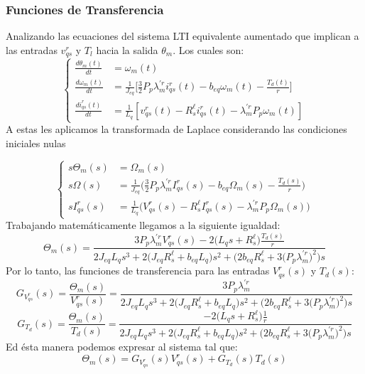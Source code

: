 \documentclass[blue,fullpaper]{ludusofficial}  %
\begin{document}
\subsubsection{Funciones de Transferencia}
Analizando las ecuaciones del sistema LTI equivalente aumentado que implican a las entradas $v^r_{qs}$ y $T_l$ hacia la salida $\theta_m$. Los cuales son:
\begin{equation}
\label{eq:modelo-lti-transferencias}
\left\{
\begin{aligned}
\frac{d\theta_m(t)}{dt} &= \omega_m(t) \\[1.5ex]
\frac{d\omega_{m}(t)}{dt} &= \frac{1}{J_{eq}} \Bigg[ \frac{3}{2}P_{p} \lambda_{m}^{'r} i_{qs}^{r}(t) - b_{eq} \omega_{m}(t) - \frac{T_d(t)}{r} \Bigg]  \\[1.5ex]
\frac{di_{qs}^{r}(t)}{dt}  &= \frac{1}{L_{q} } \left[ v_{qs}^{r}(t) - R_{s}^{\ell} i_{qs}^{r}(t) - \lambda_{m}^{'r}P_{p} \omega_{m}(t) \right]
\end{aligned}
\right.
\end{equation}
A estas les aplicamos la transformada de Laplace considerando las condiciones iniciales nulas


\begin{equation*}
\left\{
\begin{aligned}
s\Theta_m(s) &= \Omega_m(s)\\
s\Omega(s) &= \frac{1}{J_{eq}}\Big(\frac{3}{2}P_p\lambda^{'r}_mI^r_{qs}(s)-b_{eq}\Omega_m(s)-\frac{T_d(s)}{r}\Big)\\
sI^r_{qs}(s) &= \frac{1}{L_q}\Big(V^r_{qs}(s)-R^\ell_{s}I^r_{qs}(s)-\lambda^{'r}_mP_p\Omega_m(s)\Big)
\end{aligned}
\right.
\end{equation*}
Trabajando matemáticamente llegamos a la siguiente igualdad:
\begin{equation}
\label{eq:respuesta-posicion-la}
    \Theta_m(s) = \frac{3P_p\lambda_m^{'r}V_{qs}^r(s)-2\Big(L_qs+R^\ell_s\Big)\frac{T_d(s)}{r}}{2J_{eq}L_qs^3+2\Big(J_{eq}R_s^\ell+b_{eq}L_q\Big)s^2+\Big(2b_{eq}R_s^\ell+3\Big(P_p\lambda^{'r}_m\Big)^2\Big)s}
\end{equation}
Por lo tanto, las funciones de transferencia para las entradas $V^r_{qs}(s)$ y $T_d(s)$:
\begin{equation}
\label{eq:transferencia-tension-la}
    G_{V^r_{qs}}(s)=\frac{\Theta_m(s)}{V_{qs}^r(s)} = \frac{3P_p\lambda_m^{'r}}{2J_{eq}L_qs^3+2\Big(J_{eq}R_s^\ell+b_{eq}L_q\Big)s^2+\Big(2b_{eq}R_s^\ell+3\Big(P_p\lambda^{'r}_m\Big)^2\Big)s}    
\end{equation}
\begin{equation}
\label{eq:transferencia-carga-la}
    G_{T_d}(s)=\frac{\Theta_m(s)}{T_d(s)}= \frac{-2\Big(L_qs+R^\ell_s\Big)\frac{1}{r}}{2J_{eq}L_qs^3+2\Big(J_{eq}R_s^\ell+b_{eq}L_q\Big)s^2+\Big(2b_{eq}R_s^\ell+3\Big(P_p\lambda^{'r}_m\Big)^2\Big)s}
\end{equation}
Ed ésta manera podemos expresar al sistema tal que: 
\begin{equation}
\label{eq:superposicion-la}
    \Theta_m(s)=G_{V^r_{qs}}(s)V^r_{qs}(s)+G_{T_d}(s)T_d(s)
\end{equation}
\end{document}
